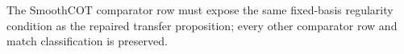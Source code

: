 The SmoothCOT comparator row must expose the same fixed-basis regularity condition as the repaired transfer proposition; every other comparator row and match classification is preserved.